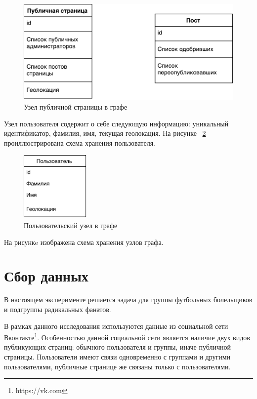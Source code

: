 \documentclass[annotation,times,page4]{itmo-student-thesis}
\begin{document}
\begin{figure}[!h]
\caption{Узел публичной страницы в графе}
\label{fig:public}
\centering
\includegraphics[width=\textwidth]{figs/public.pdf}
\end{figure}

Узел пользователя содержит о себе следующую информацию: уникальный идентификатор, фамилия, имя, текущая геолокация. На рисунке ~\ref{fig:user} проиллюстрирована схема хранения пользователя.

\begin{figure}[!h]
\caption{Пользовательский узел в графе}
\label{fig:user}
\centering
\includegraphics[width=0.3\textwidth]{figs/user.pdf}
\end{figure}

\newpage
На рисункe изображена схема хранения узлов графа.    

\section{Сбор данных}
В настоящем эксперименте решается задача для группы футбольных болельщиков и подгруппы радикальных фанатов.

В рамках данного исследования используются данные из социальной сети Вконтакте\footnote{https://vk.com}. Особенностью данной социальной сети является наличие двух видов публикующих страниц: обычного пользователя и группы, иначе публичной страницы. Пользователи имеют связи одновременно с группами и другими пользователями, публичные странице же связаны только с пользователями. 
\end{document}
